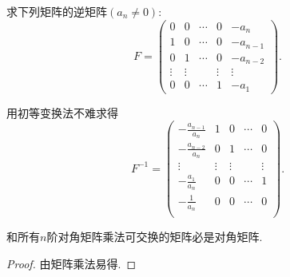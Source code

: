 \documentclass[../../main.tex]{subfiles}%
\begin{document}
\begin{example}
求下列矩阵的逆矩阵\((a_n\neq0)\):
\[
F = 
\begin{pmatrix}
0 & 0 & \cdots & 0 & -a_n\\
1 & 0 & \cdots & 0 & -a_{n - 1}\\
0 & 1 & \cdots & 0 & -a_{n - 2}\\
\vdots & \vdots & & \vdots & \vdots\\
0 & 0 & \cdots & 1 & -a_1
\end{pmatrix}.
\]
\end{example}
\begin{solution}

用初等变换法不难求得
\[
F^{-1}=\left( \begin{matrix}
-\frac{a_{n-1}}{a_n}&		1&		0&		\cdots&		0\\
-\frac{a_{n-2}}{a_n}&		0&		1&		\cdots&		0\\
\vdots&		\vdots&		\vdots&		&		\vdots\\
-\frac{a_1}{a_n}&		0&		0&		\cdots&		1\\
-\frac{1}{a_n}&		0&		0&		\cdots&		0\\
\end{matrix} \right) .
\]

\end{solution}


\begin{proposition}\label{proposition:与对角矩阵可交换的矩阵必是对角阵}
和所有$n$阶对角矩阵乘法可交换的矩阵必是对角矩阵.
\end{proposition}
\begin{proof}

由矩阵乘法易得.

\end{proof}
\end{document}
